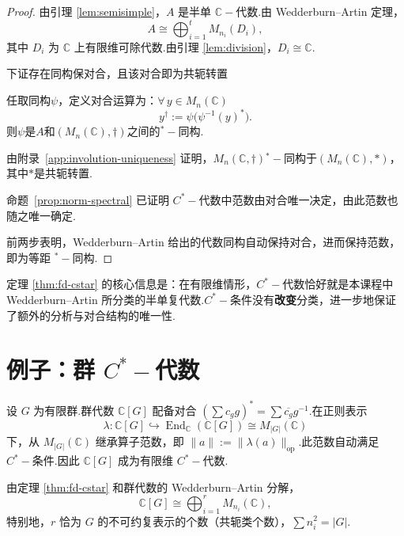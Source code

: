 \documentclass[math-font=lm, text-font=lm, math-style=TeX]{sjtureport}
\theoremstyle{plain}
\newtheorem*{proof}{证明}
\theoremstyle{plain}
\DeclareMathOperator{\End}{End}
\begin{document}
\begin{proof}
    由引理 \ref{lem:semisimple}，$A$ 是半单 $\mathbb{C}-\!$代数.由 Wedderburn--Artin 定理，
    \begin{equation}
        A \cong \bigoplus_{i=1}^t M_{n_i}(D_i),
    \end{equation}
    其中 $D_i$ 为 $\mathbb{C}$ 上有限维可除代数.由引理 \ref{lem:division}，$D_i \cong \mathbb{C}$.\par
    下证存在同构保对合，且该对合即为共轭转置\par
    任取同构$\psi$，定义对合运算为：$\forall\, y\in M_n(\mathbb{C})$
    \begin{equation*}
        y^\dag := \psi\bigl(\psi^{-1}(y)^*\bigr).
    \end{equation*}
    则$\psi$是$A$和$(M_n(\mathbb{C}),\dag)$之间的${}^*-\!$同构.\par
    由附录~\ref{app:involution-uniqueness} 证明，$M_n(\mathbb{C},\dag)$${}^*-\!$同构于$(M_n(\mathbb{C}), *)$，其中$*$是共轭转置.\par
    命题~\ref{prop:norm-spectral} 已证明 $C^*-\!$代数中范数由对合唯一决定，由此范数也随之唯一确定.\par
    前两步表明，Wedderburn--Artin 给出的代数同构自动保持对合，进而保持范数，即为等距 ${}^*-\!$同构.
\end{proof}

定理 \ref{thm:fd-cstar} 的核心信息是：在有限维情形，$C^*-\!$代数恰好就是本课程中 Wedderburn--Artin 所分类的半单复代数.$C^*-\!$条件没有\textbf{改变}分类，进一步地保证了额外的分析与对合结构的唯一性.

\section{例子：群 $C^*-\!$代数}

设 $G$ 为有限群.群代数 $\mathbb{C}[G]$ 配备对合 $(\sum c_g g)^* = \sum \overline{c_g} g^{-1}$.在正则表示
\begin{equation}
    \lambda: \mathbb{C}[G] \hookrightarrow \End_{\mathbb{C}}(\mathbb{C}[G]) \cong M_{|G|}(\mathbb{C})
\end{equation}
下，从 $M_{|G|}(\mathbb{C})$ 继承算子范数，即 $\|a\| := \|\lambda(a)\|_{\mathrm{op}}$.此范数自动满足 $C^*-\!$条件.因此 $\mathbb{C}[G]$ 成为有限维 $C^*-\!$代数.

由定理 \ref{thm:fd-cstar} 和群代数的 Wedderburn--Artin 分解，
\begin{equation}\label{eq:group-cstar}
    \mathbb{C}[G] \cong \bigoplus_{i=1}^r M_{n_i}(\mathbb{C}),
\end{equation}
特别地，$r$ 恰为 $G$ 的不可约复表示的个数（共轭类个数），$\sum n_i^2 = |G|$.
\end{document}
